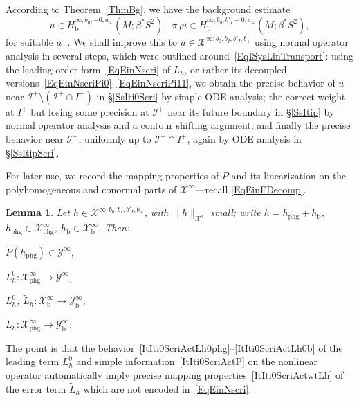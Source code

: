 \documentclass[reqno,11pt,letterpaper]{amsart}
\numberwithin{equation}{section}
\numberwithin{figure}{section}
\newtheorem{lemma}[thm]{Lemma}
\theoremstyle{definition}
\theoremstyle{remark}
\newcommand{\mc}{\mathcal}
\newcommand{\cX}{\mc X}
\newcommand{\cY}{\mc Y}
\newcommand{\ms}{\mathscr}
\newcommand{\scri}{\ms I}
\newcommand{\wt}{\widetilde}
\newcommand{\bop}{{\mathrm{b}}}
\newcommand{\Hb}{H_{\bop}}
\newcommand{\phg}{{\mathrm{phg}}}
\begin{document}
According to Theorem~\ref{ThmBg}, we have the background estimate
\begin{equation}
\label{EqItBg}
  u\in\Hb^{\infty;b_0,-0,a_+}(M;\beta^*S^2),\ \ 
  \pi_0 u\in\Hb^{\infty;b_0,b'_I-0,a_+}(M;\beta^*S^2),
\end{equation}
for suitable $a_+$. We shall improve this to $u\in\cX^{\infty;b_0,b_I,b'_I,b_+}$ using normal operator analysis in several steps, which were outlined around~\eqref{EqISysLinTransport}: using the leading order form~\eqref{EqEinNscri} of $L_h$, or rather its decoupled versions~\eqref{EqEinNscriPi0}--\eqref{EqEinNscriPi11}, we obtain the precise behavior of $u$ near $\scri^+\setminus(\scri^+\cap I^+)$ in \S\ref{SsIti0Scri} by simple ODE analysis; the correct weight at $I^+$ but losing some precision at $\scri^+$ near its future boundary in \S\ref{SsItip} by normal operator analysis and a contour shifting argument; and finally the precise behavior near $\scri^+$, uniformly up to $\scri^+\cap I^+$, again by ODE analysis in \S\ref{SsItipScri}.

For later use, we record the mapping properties of $P$ and its linearization on the polyhomogeneous and conormal parts of $\cX^\infty$---recall \eqref{EqEinFDecomp}.
\begin{lemma}
\label{LemmaIti0ScriAct}
  Let $h\in\cX^{\infty;b_0,b_I,b'_I,b_+}$, with $\|h\|_{\cX^3}$ small; write $h=h_\phg+h_\bop$, $h_\phg\in\cX^\infty_\phg$, $h_\bop\in\cX^\infty_\bop$. Then:
  \begin{enumerate*}
  \item\label{ItIti0ScriActP} $P(h_\phg)\in\cY^\infty$,
  \item\label{ItIti0ScriActLh0phg} $L_h^0\colon\cX^\infty_\phg\to\cY^\infty$,
  \item\label{ItIti0ScriActLh0b} $L_h^0$, $\wt L_h\colon\cX^\infty_\bop\to\cY^\infty_\bop$,
  \item\label{ItIti0ScriActwtLh} $\wt L_h\colon\cX^\infty_\phg\to\cY^\infty_\bop$.
  \end{enumerate*}
\end{lemma}

The point is that the behavior~\eqref{ItIti0ScriActLh0phg}--\eqref{ItIti0ScriActLh0b} of the leading term $L_h^0$ and simple information~\eqref{ItIti0ScriActP} on the nonlinear operator automatically imply precise mapping properties~\eqref{ItIti0ScriActwtLh} of the error term $\wt L_h$ which are not encoded in~\eqref{EqEinNscri}.
\end{document}
